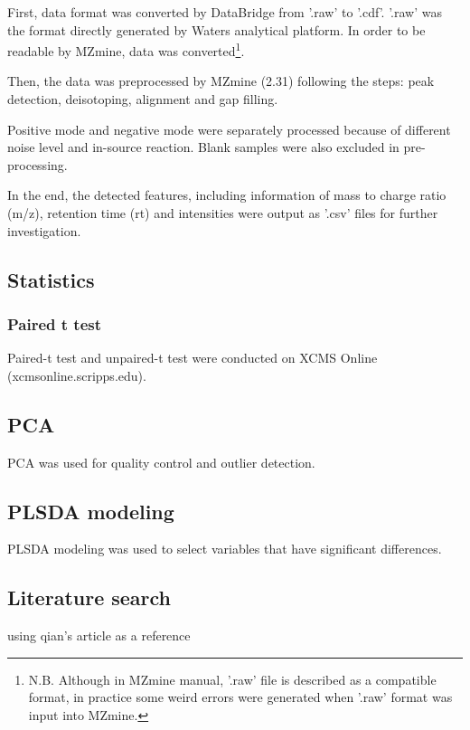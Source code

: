First, data format was converted by DataBridge from '.raw' to '.cdf'. '.raw' was the format directly generated by Waters analytical platform. In order to be readable by MZmine, data was converted\footnote{N.B. Although in MZmine manual, '.raw' file is described as a compatible format, in practice some weird errors were generated when '.raw' format was input into MZmine.}.

Then, the data was preprocessed by MZmine (2.31) following the steps: peak detection, deisotoping, alignment and gap filling.

Positive mode and negative mode were separately processed because of different noise level and in-source reaction. Blank samples were also excluded in pre-processing.

In the end, the detected features, including information of mass to charge ratio (m/z), retention time (rt) and intensities were output as '.csv' files for further investigation.


\subsection{Statistics}
\subsubsection{Paired t test}
Paired-t test and unpaired-t test were conducted on XCMS Online (xcmsonline.scripps.edu).

\subsection{PCA}
PCA was used for quality control and outlier detection.

\subsection{PLSDA modeling}
PLSDA modeling was used to select variables that have significant differences. 

\subsection{Literature search}
using qian's article as a reference
